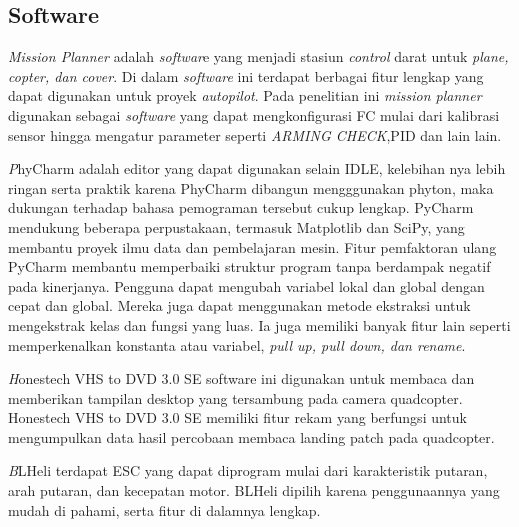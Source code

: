 \subsection{Software}
\begin{packed_item}
	\item [1.]\textit{Mission Planner}
	adalah \textit{softwar}e yang menjadi stasiun \textit{control} darat untuk \textit{plane, copter, dan cover}. Di dalam \textit{software} ini terdapat berbagai fitur lengkap yang dapat digunakan untuk proyek \textit{autopilot}. Pada penelitian ini \textit{mission planner} digunakan sebagai \textit{software} yang dapat mengkonfigurasi FC mulai dari kalibrasi sensor hingga mengatur parameter seperti \textit{ARMING CHECK},PID dan lain lain.
	\item [2.]\textit PhyCharm
	adalah editor yang dapat digunakan selain IDLE, kelebihan nya lebih ringan serta praktik karena PhyCharm dibangun mengggunakan phyton, maka dukungan terhadap bahasa pemograman tersebut cukup lengkap. PyCharm mendukung beberapa perpustakaan, termasuk Matplotlib dan SciPy, yang membantu proyek ilmu data dan pembelajaran mesin. Fitur pemfaktoran ulang PyCharm membantu memperbaiki struktur program tanpa berdampak negatif pada kinerjanya. Pengguna dapat mengubah variabel lokal dan global dengan cepat dan global. Mereka juga dapat menggunakan metode ekstraksi untuk mengekstrak kelas dan fungsi yang luas. Ia juga memiliki banyak fitur lain seperti memperkenalkan konstanta atau variabel, \textit{pull up, pull down, dan rename}.
	\item [3.]\textit Honestech VHS to DVD 3.0 SE
	software ini digunakan untuk membaca dan memberikan tampilan desktop yang tersambung pada camera quadcopter. Honestech VHS to DVD 3.0 SE memiliki fitur rekam yang berfungsi untuk mengumpulkan data hasil percobaan membaca landing patch pada quadcopter.
	\item [4.]\textit BLHeli
	terdapat ESC yang dapat diprogram mulai dari karakteristik putaran, arah putaran, dan kecepatan motor. BLHeli dipilih karena penggunaannya yang mudah di pahami, serta fitur di dalamnya lengkap.
\end{packed_item}

